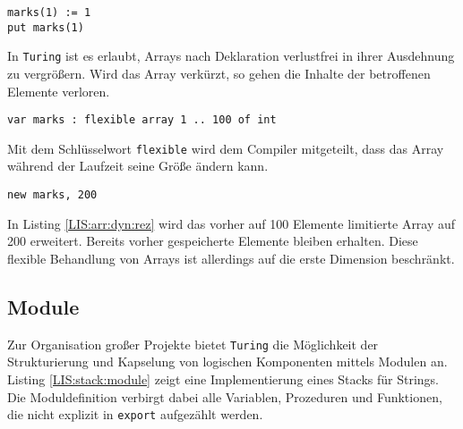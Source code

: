 \lstset{label=LIS:arr:usage}
\begin{table}[h!]
\begin{lstlisting}
marks(1) := 1
put marks(1)
\end{lstlisting}
\end{table}


In \texttt{Turing} ist es erlaubt, Arrays nach Deklaration verlustfrei in ihrer Ausdehnung zu vergr\"o\ss{}ern. Wird das Array verk\"urzt, so gehen die Inhalte der betroffenen Elemente verloren. 

\lstset{label=LIS:arr:dyn}
\begin{table}[h!]
\begin{lstlisting}
var marks : flexible array 1 .. 100 of int
\end{lstlisting}
\end{table}

Mit dem Schl\"usselwort \lstinline{flexible} wird dem Compiler mitgeteilt, dass das Array w\"ahrend der Laufzeit seine Gr\"o\ss{}e \"andern kann.

\lstset{label=LIS:arr:dyn:rez}
\begin{table}[h!]
\begin{lstlisting}
new marks, 200
\end{lstlisting}
\end{table}

In Listing \ref{LIS:arr:dyn:rez} wird das vorher auf 100 Elemente limitierte Array auf 200 erweitert. Bereits vorher gespeicherte Elemente bleiben erhalten. Diese flexible Behandlung von Arrays ist allerdings auf die erste Dimension beschr\"ankt.

\subsection{Module}

Zur Organisation gro\ss{}er Projekte bietet \texttt{Turing} die M\"oglichkeit der Strukturierung und Kapselung von logischen Komponenten mittels Modulen an. \\
Listing \ref{LIS:stack:module} zeigt eine Implementierung eines Stacks f\"ur Strings. Die Moduldefinition verbirgt dabei alle Variablen, Prozeduren und Funktionen, die nicht explizit in \lstinline{export} aufgez\"ahlt werden.

